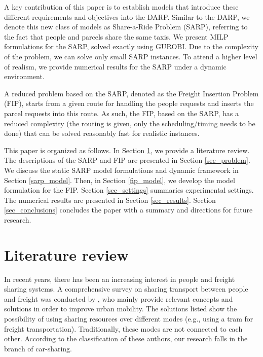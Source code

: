 \documentclass[preprint,authoryear,12pt]{elsarticle}
\begin{document}
A key contribution of this paper is to establish models that introduce these different requirements and objectives into the DARP. Similar to the DARP, we denote this new class of models as Share-a-Ride Problem (SARP), referring to the fact that people and parcels share the same taxis. We present MILP formulations for the SARP, solved exactly using GUROBI. Due to the complexity of the problem, we can solve only small SARP instances. To attend a higher level of realism, we provide numerical results for the SARP under a dynamic environment.

A reduced problem based on the SARP, denoted as the Freight Insertion Problem (FIP), starts from a given route for handling the people requests and inserts the parcel requests into this route. As such, the FIP, based on the SARP, has a reduced complexity (the routing is given, only the scheduling/timing needs to be done) that can be solved reasonably fast for realistic instances.

This paper is organized as follows. In Section \ref{sec_review}, we provide a literature review. The descriptions of  the SARP and FIP are presented in Section \ref{sec_problem}. We discuss the static SARP model formulations and dynamic framework in Section \ref{sarp_model}. Then, in Section \ref{fip_model}, we develop the model formulation for the FIP. Section \ref{sec_settings} summaries experimental settings. The numerical results are presented in Section \ref{sec_results}. Section \ref{sec_conclusions} concludes the paper with a summary and directions for future research.










\section{Literature review}\label{sec_review}
In recent years, there has been an increasing interest in people and freight sharing systems. A comprehensive survey on sharing transport between people and freight was conducted by \cite{Trentini}, who mainly provide relevant concepts and solutions in order to improve urban mobility. The solutions listed show the possibility of using sharing resources over different modes (e.g., using a tram for freight transportation). Traditionally, these modes are not connected to each other. According to the classification of these authors, our research falls in the branch of car-sharing.
\end{document}
